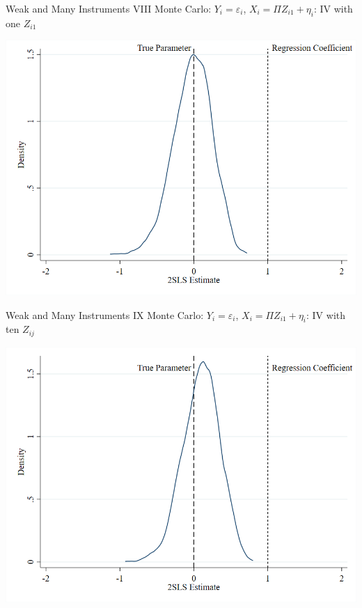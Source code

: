 \documentclass{beamer}
\begin{document}
\begin{frame}{Weak and Many Instruments VIII}
Monte Carlo: $Y_i=\varepsilon_i$, $X_i=\Pi Z_{i1}+\eta_i$: IV with one $Z_{i1}$
\begin{center}
\includegraphics[scale=0.35]{./lecture_includes/fewz.png}
\end{center}

\end{frame}

\begin{frame}{Weak and Many Instruments IX}
Monte Carlo: $Y_i=\varepsilon_i$, $X_i=\Pi Z_{i1}+\eta_i$: IV with ten $Z_{ij}$
\begin{center}
\includegraphics[scale=0.35]{./lecture_includes/somez.png}
\end{center}

\end{frame}
\end{document}
